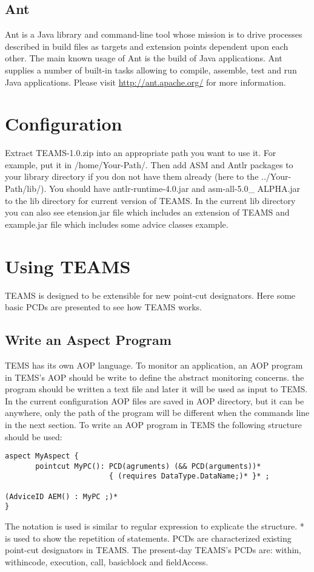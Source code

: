 \documentclass{report}
\begin{document}
\subsection{Ant}
Ant is a Java library and command-line tool whose mission is to drive processes described in build files as targets and extension points dependent upon each other. The main known usage of Ant is the build of Java applications. Ant supplies a number of built-in tasks allowing to compile, assemble, test and run Java applications. Please visit \url{http://ant.apache.org/} for more information.

\section{Configuration}
Extract TEAMS-1.0.zip into an appropriate path you want to use it. For example, put it in /home/Your-Path/. Then add ASM and Antlr packages to your library directory if you don not have them already  (here to the ../Your-Path/lib/). You should have antlr-runtime-4.0.jar and asm-all-5.0\_ ALPHA.jar to the lib directory for current version of TEAMS. In the current lib directory you can also see etension.jar file which includes an extension of T{\small EAMS} and example.jar file which includes some advice classes example.

\section{Using T{\small EAMS}} 
T{\small EAMS} is designed to be extensible for new point-cut designators. Here some basic PCDs are presented to see how T{\small EAMS} works.

\subsection{Write an Aspect Program}
T{\small EMS} has its own AOP language. To monitor an application, an AOP program in T{\small EMS}'s AOP should be write to define the abstract monitoring concerns. the program should be written a text file and later it will be used as input to T{\small EMS}. In the current configuration AOP files are saved in AOP directory, but it can be anywhere, only the path of the program will be different when  the commands line in the next section. To write an AOP program in T{\small EMS} the following structure should be used:
\begin{verbatim}
aspect MyAspect {
       pointcut MyPC(): PCD(agruments) (&& PCD(arguments))*
                        { (requires DataType.DataName;)* }* ;

(AdviceID AEM() : MyPC ;)*
}
\end{verbatim}
The notation is used is similar to regular expression to explicate the structure. * is used to show the repetition of statements. PCDs are characterized existing point-cut designators in T{\small EAMS}. The present-day T{\small EAMS}'s PCDs are: within, withincode, execution, call, basicblock and fieldAccess.
\end{document}

